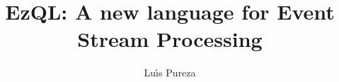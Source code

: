 \documentclass[a4,11pt]{report}
\begin{document}
\title{EzQL: A new language for Event Stream Processing}
\author{Lu\'{\i}s Pureza}

\maketitle

\tableofcontents

\addtolength{\parskip}{\baselineskip}












\appendix

\end{document}
